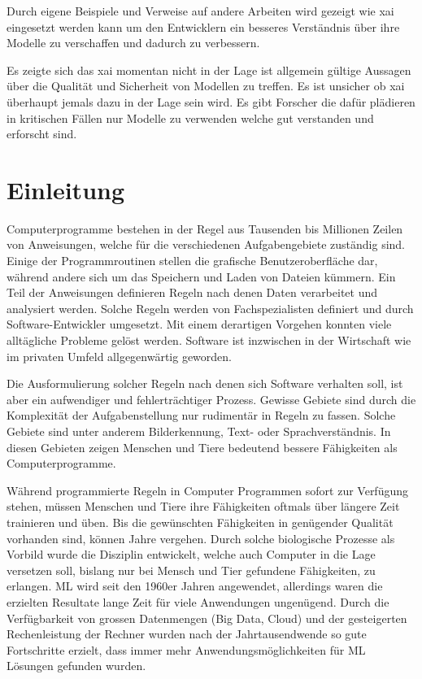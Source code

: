 \documentclass[
  12pt, %
  a4paper, %
  oneside, %
  openany, 
  numbers=noenddot, %
  BCOR=5mm, %
  parskip=half*, %
  thesis, %
]{bfhbook}
\begin{document}
Durch eigene Beispiele und Verweise auf andere Arbeiten wird gezeigt wie \Gls{xai} eingesetzt werden kann um den Entwicklern ein besseres Verständnis über ihre Modelle  zu verschaffen und dadurch zu verbessern.

Es zeigte sich das \Gls{xai} momentan nicht in der Lage ist allgemein gültige Aussagen über die Qualität und Sicherheit von  Modellen zu treffen. Es ist unsicher ob \Gls{xai} überhaupt jemals dazu in der Lage sein wird. Es gibt Forscher die dafür plädieren in kritischen Fällen nur Modelle zu verwenden welche gut verstanden und erforscht sind.

\chapter{Einleitung}
Computerprogramme bestehen in der Regel aus Tausenden bis Millionen Zeilen von Anweisungen, welche für die verschiedenen Aufgabengebiete zuständig sind. Einige der Programmroutinen stellen die grafische Benutzeroberfläche dar, während andere sich um das Speichern und Laden von Dateien kümmern. Ein Teil der Anweisungen definieren Regeln nach denen Daten verarbeitet und analysiert werden. Solche Regeln werden von Fachspezialisten definiert und durch Software-Entwickler umgesetzt. Mit einem derartigen Vorgehen konnten viele alltägliche Probleme gelöst werden. Software ist inzwischen in der Wirtschaft wie im privaten Umfeld allgegenwärtig geworden. 

Die Ausformulierung solcher Regeln nach denen sich Software verhalten soll, ist aber ein aufwendiger und fehlerträchtiger Prozess. Gewisse Gebiete sind durch die Komplexität der Aufgabenstellung nur rudimentär in Regeln zu fassen. Solche Gebiete sind unter anderem Bilderkennung, Text- oder Sprachverständnis. In diesen Gebieten zeigen Menschen und Tiere bedeutend bessere Fähigkeiten als Computerprogramme. 

Während programmierte Regeln in Computer Programmen sofort zur Verfügung stehen, müssen Menschen und Tiere ihre Fähigkeiten oftmals über längere Zeit trainieren und üben. Bis die gewünschten Fähigkeiten in genügender Qualität vorhanden sind, können Jahre vergehen. Durch solche biologische Prozesse als Vorbild wurde die Disziplin  entwickelt, welche auch Computer in die Lage versetzen soll, bislang nur bei Mensch und Tier gefundene Fähigkeiten, zu erlangen.
\gls{ML} wird seit den 1960er Jahren angewendet, allerdings waren die erzielten Resultate lange Zeit für viele Anwendungen ungenügend. Durch die Verfügbarkeit von grossen Datenmengen (Big Data, Cloud) und der gesteigerten Rechenleistung der Rechner wurden nach der Jahrtausendwende so gute Fortschritte erzielt, dass immer mehr Anwendungsmöglichkeiten für \gls{ML} Lösungen gefunden wurden. 
\end{document}
